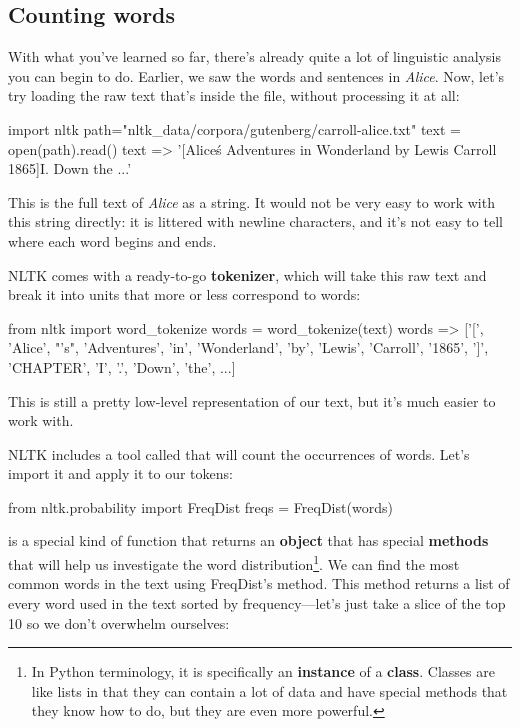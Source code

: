 \documentclass{article}
\newcommand\pyi\pythoninline
\begin{document}
\subsection{Counting words}

With what you've learned so far, there's already quite a lot of linguistic analysis you can begin to do. Earlier, we saw the words and sentences in \emph{Alice}. Now, let's try loading the raw text that's inside the file, without processing it at all:

\begin{python}
import nltk
path="nltk_data/corpora/gutenberg/carroll-alice.txt"
text = open(path).read()
text
=> '[Alice\'s Adventures in Wonderland by Lewis 
Carroll 1865]\n\nCHAPTER I. Down the ...'
\end{python}

\noindent This is the full text of \emph{Alice} as a string. It would not be very easy to work with this string directly: it is littered with newline characters, and it's not easy to tell where each word begins and ends.

NLTK comes with a ready-to-go \textbf{tokenizer}, which will take this raw text and break it into units that more or less correspond to words:

\begin{python}
from nltk import word_tokenize
words = word_tokenize(text)
words
=> ['[', 'Alice', "'s", 'Adventures', 'in', 
'Wonderland', 'by', 'Lewis', 'Carroll', '1865', 
']', 'CHAPTER', 'I', '.', 'Down', 'the', ...]
\end{python}

\noindent This is still a pretty low-level representation of our text, but it's much easier to work with.

NLTK includes a tool called \pyi{FreqDist} that will count the occurrences of words. Let's import it and apply it to our tokens:

\begin{python}
from nltk.probability import FreqDist
freqs = FreqDist(words)
\end{python}

\noindent \pyi{FreqDist} is a special kind of function that returns an \textbf{object} that has special \textbf{methods} that will help us investigate the word distribution\footnote{In Python terminology, it is specifically an \textbf{instance} of a \textbf{class}. Classes are like lists in that they can contain a lot of data and have special methods that they know how to do, but they are even more powerful.}. We can find the most common words in the text using FreqDist's \pyi{most_common} method. This method returns a list of every word used in the text sorted by frequency---let's just take a slice of the top 10 so we don't overwhelm ourselves:
\end{document}
